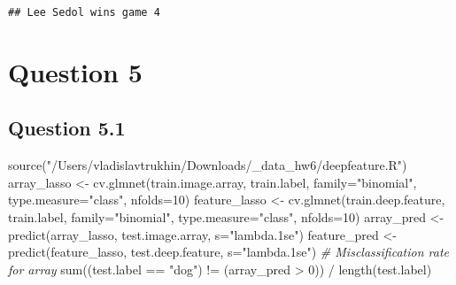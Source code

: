 \documentclass[
]{article}
\newenvironment{Shaded}{\begin{snugshade}}{\end{snugshade}}
\newcommand{\AttributeTok}[1]{\textcolor[rgb]{0.77,0.63,0.00}{#1}}
\newcommand{\CommentTok}[1]{\textcolor[rgb]{0.56,0.35,0.01}{\textit{#1}}}
\newcommand{\ControlFlowTok}[1]{\textcolor[rgb]{0.13,0.29,0.53}{\textbf{#1}}}
\newcommand{\DecValTok}[1]{\textcolor[rgb]{0.00,0.00,0.81}{#1}}
\newcommand{\FunctionTok}[1]{\textcolor[rgb]{0.00,0.00,0.00}{#1}}
\newcommand{\NormalTok}[1]{#1}
\newcommand{\OtherTok}[1]{\textcolor[rgb]{0.56,0.35,0.01}{#1}}
\newcommand{\SpecialCharTok}[1]{\textcolor[rgb]{0.00,0.00,0.00}{#1}}
\newcommand{\StringTok}[1]{\textcolor[rgb]{0.31,0.60,0.02}{#1}}
\begin{document}
\begin{Shaded}
\end{Shaded}

\begin{verbatim}
## Lee Sedol wins game 4
\end{verbatim}

\hypertarget{question-5}{%
\section{Question 5}\label{question-5}}

\hypertarget{question-5.1}{%
\subsection{Question 5.1}\label{question-5.1}}

\begin{Shaded}
\begin{Highlighting}[]
\FunctionTok{source}\NormalTok{(}\StringTok{"/Users/vladislavtrukhin/Downloads/\_data\_hw6/deepfeature.R"}\NormalTok{)}
\NormalTok{array\_lasso }\OtherTok{\textless{}{-}} \FunctionTok{cv.glmnet}\NormalTok{(train.image.array, train.label, }\AttributeTok{family=}\StringTok{"binomial"}\NormalTok{, }
                         \AttributeTok{type.measure=}\StringTok{"class"}\NormalTok{, }\AttributeTok{nfolds=}\DecValTok{10}\NormalTok{)}
\NormalTok{feature\_lasso }\OtherTok{\textless{}{-}} \FunctionTok{cv.glmnet}\NormalTok{(train.deep.feature, train.label, }\AttributeTok{family=}\StringTok{"binomial"}\NormalTok{, }
                           \AttributeTok{type.measure=}\StringTok{"class"}\NormalTok{, }\AttributeTok{nfolds=}\DecValTok{10}\NormalTok{)}
\NormalTok{array\_pred }\OtherTok{\textless{}{-}} \FunctionTok{predict}\NormalTok{(array\_lasso, test.image.array, }\AttributeTok{s=}\StringTok{"lambda.1se"}\NormalTok{)}
\NormalTok{feature\_pred }\OtherTok{\textless{}{-}} \FunctionTok{predict}\NormalTok{(feature\_lasso, test.deep.feature, }\AttributeTok{s=}\StringTok{"lambda.1se"}\NormalTok{)}
\CommentTok{\# Misclassification rate for array}
\FunctionTok{sum}\NormalTok{((test.label }\SpecialCharTok{==} \StringTok{"dog"}\NormalTok{) }\SpecialCharTok{!=}\NormalTok{ (array\_pred }\SpecialCharTok{\textgreater{}} \DecValTok{0}\NormalTok{)) }\SpecialCharTok{/} \FunctionTok{length}\NormalTok{(test.label)}
\end{Highlighting}
\end{Shaded}
\end{document}
